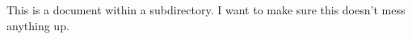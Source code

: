 \documentclass[a4paper]{article}
\begin{document}
This is a document within a subdirectory.
I want to make sure this doesn't mess anything up.
\end{document}
